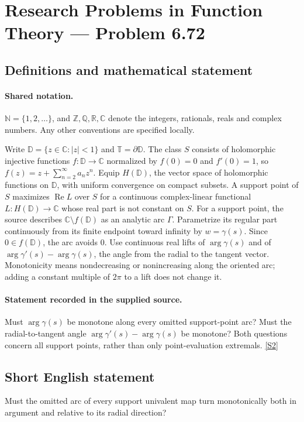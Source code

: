 \documentclass[11pt]{article}
\newcommand{\sref}[2]{\hyperlink{source:#1:#2}{[S#2]}}
\begin{document}
\section{Research Problems in Function Theory — Problem 6.72}\label{statement}

\subsection{Definitions and mathematical statement}

\paragraph{Shared notation.}$\mathbb N=\{1,2,\ldots\}$, and $\mathbb Z,\mathbb Q,\mathbb R,\mathbb C$ denote the integers, rationals, reals and complex numbers. Any other conventions are specified locally.


Write $\mathbb D=\{z\in\mathbb C:|z|<1\}$ and $\mathbb T=\partial\mathbb D$. The class $S$ consists of holomorphic injective functions $f:\mathbb D\to\mathbb C$ normalized by $f(0)=0$ and $f'(0)=1$, so $f(z)=z+\sum_{n=2}^{\infty}a_nz^n$. Equip $H(\mathbb D)$, the vector space of holomorphic functions on $\mathbb D$, with uniform convergence on compact subsets. A support point of $S$ maximizes $\operatorname{Re}L$ over $S$ for a continuous complex-linear functional $L:H(\mathbb D)\to\mathbb C$ whose real part is not constant on $S$. For a support point, the source describes $\mathbb C\setminus f(\mathbb D)$ as an analytic arc $\Gamma$. Parametrize its regular part continuously from its finite endpoint toward infinity by $w=\gamma(s)$. Since $0\in f(\mathbb D)$, the arc avoids $0$. Use continuous real lifts of $\arg\gamma(s)$ and of $\arg\gamma'(s)-\arg\gamma(s)$, the angle from the radial to the tangent vector. Monotonicity means nondecreasing or nonincreasing along the oriented arc; adding a constant multiple of $2\pi$ to a lift does not change it.
\paragraph{Statement recorded in the supplied source.}
Must $\arg\gamma(s)$ be monotone along every omitted support-point arc? Must the radial-to-tangent angle $\arg\gamma'(s)-\arg\gamma(s)$ be monotone? Both questions concern all support points, rather than only point-evaluation extremals. \sref{statement}{2}
\subsection{Short English statement}
Must the omitted arc of every support univalent map turn monotonically both in argument and relative to its radial direction?
\end{document}
